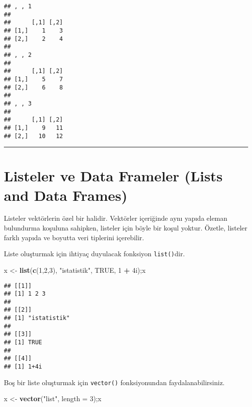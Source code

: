 \documentclass[
]{book}
\newenvironment{Shaded}{\begin{snugshade}}{\end{snugshade}}
\newcommand{\DataTypeTok}[1]{\textcolor[rgb]{0.13,0.29,0.53}{#1}}
\newcommand{\DecValTok}[1]{\textcolor[rgb]{0.00,0.00,0.81}{#1}}
\newcommand{\KeywordTok}[1]{\textcolor[rgb]{0.13,0.29,0.53}{\textbf{#1}}}
\newcommand{\NormalTok}[1]{#1}
\newcommand{\OperatorTok}[1]{\textcolor[rgb]{0.81,0.36,0.00}{\textbf{#1}}}
\newcommand{\OtherTok}[1]{\textcolor[rgb]{0.56,0.35,0.01}{#1}}
\newcommand{\StringTok}[1]{\textcolor[rgb]{0.31,0.60,0.02}{#1}}
\begin{document}
\begin{verbatim}
## , , 1
## 
##      [,1] [,2]
## [1,]    1    3
## [2,]    2    4
## 
## , , 2
## 
##      [,1] [,2]
## [1,]    5    7
## [2,]    6    8
## 
## , , 3
## 
##      [,1] [,2]
## [1,]    9   11
## [2,]   10   12
\end{verbatim}

\begin{center}\rule{0.5\linewidth}{0.5pt}\end{center}

\hypertarget{listeler-ve-data-frameler-lists-and-data-frames}{%
\section{Listeler ve Data Frameler (Lists and Data Frames)}\label{listeler-ve-data-frameler-lists-and-data-frames}}

Listeler vektörlerin özel bir halidir. Vektörler içeriğinde aynı yapıda eleman bulundurma koşuluna sahipken, listeler için böyle bir koşul yoktur. Özetle, listeler farklı yapıda ve boyutta veri tiplerini içerebilir.

Liste oluşturmak için ihtiyaç duyulacak fonksiyon \texttt{list()}dir.

\begin{Shaded}
\begin{Highlighting}[]
\NormalTok{x <-}\StringTok{ }\KeywordTok{list}\NormalTok{(}\KeywordTok{c}\NormalTok{(}\DecValTok{1}\NormalTok{,}\DecValTok{2}\NormalTok{,}\DecValTok{3}\NormalTok{), }\StringTok{"istatistik"}\NormalTok{, }\OtherTok{TRUE}\NormalTok{, }\DecValTok{1} \OperatorTok{+}\StringTok{ }\NormalTok{4i);x}
\end{Highlighting}
\end{Shaded}

\begin{verbatim}
## [[1]]
## [1] 1 2 3
## 
## [[2]]
## [1] "istatistik"
## 
## [[3]]
## [1] TRUE
## 
## [[4]]
## [1] 1+4i
\end{verbatim}

Boş bir liste oluşturmak için \texttt{vector()} fonksiyonundan faydalanabilirsiniz.

\begin{Shaded}
\begin{Highlighting}[]
\NormalTok{x <-}\StringTok{ }\KeywordTok{vector}\NormalTok{(}\StringTok{"list"}\NormalTok{, }\DataTypeTok{length =} \DecValTok{3}\NormalTok{);x}
\end{Highlighting}
\end{Shaded}
\end{document}

